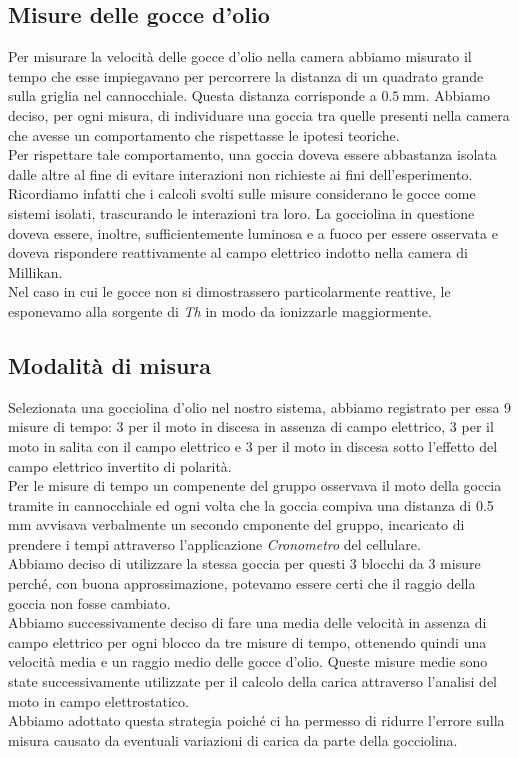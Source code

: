     \subsection{Misure delle gocce d'olio}
        Per misurare la velocità delle gocce d'olio nella camera abbiamo misurato il tempo che esse impiegavano per percorrere la distanza di un quadrato grande sulla griglia nel cannocchiale.
        Questa distanza corrisponde a
            $0.5~\mathrm{mm}$.
        Abbiamo deciso, per ogni misura, di individuare una goccia tra quelle presenti nella camera che avesse un comportamento che rispettasse le ipotesi teoriche.\\
        Per rispettare tale comportamento, una goccia doveva essere abbastanza isolata dalle altre al fine di evitare interazioni non richieste ai fini dell'esperimento. Ricordiamo infatti che i calcoli svolti sulle misure considerano le gocce come sistemi isolati, trascurando le interazioni tra loro. La gocciolina in questione doveva essere, inoltre, sufficientemente luminosa e a fuoco per essere osservata e doveva rispondere reattivamente al campo elettrico indotto nella camera di Millikan.\\
        Nel caso in cui le gocce non si dimostrassero particolarmente reattive, le esponevamo alla sorgente di \textit{Th} in modo da ionizzarle maggiormente.\\
    \subsection{Modalità di misura}
        Selezionata una gocciolina d'olio nel nostro sistema, abbiamo registrato per essa 9 misure di tempo: 3 per il moto in discesa in assenza di campo elettrico, 3 per il moto in salita con il campo elettrico e 3 per il moto in discesa sotto l'effetto del campo elettrico invertito di polarità.\\
        Per le misure di tempo un compenente del gruppo osservava il moto della goccia tramite in cannocchiale ed ogni volta che la goccia compiva una distanza di 0.5 mm avvisava verbalmente un secondo cmponente del gruppo, incaricato di prendere i tempi attraverso l'applicazione \textit{Cronometro} del cellulare.\\  
        Abbiamo deciso di utilizzare la stessa goccia per questi 3 blocchi da 3 misure perché, con buona approssimazione, potevamo essere certi che il raggio della goccia non fosse cambiato.\\
        Abbiamo successivamente deciso di fare una media delle velocità in assenza di campo elettrico per ogni blocco da tre misure di tempo, ottenendo quindi una velocità media e un raggio medio delle gocce d'olio. Queste misure medie sono state successivamente utilizzate per il calcolo della carica attraverso l'analisi del moto in campo elettrostatico.\\
        Abbiamo adottato questa strategia poiché ci ha permesso di ridurre l'errore sulla misura causato da eventuali variazioni di carica da parte della gocciolina.

